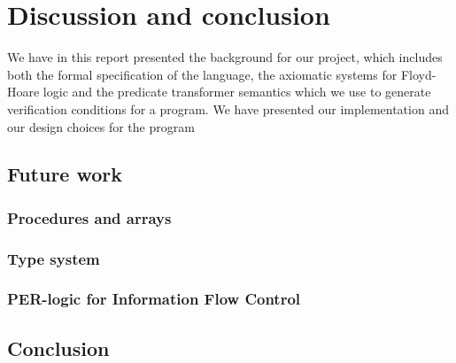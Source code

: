 \section{Discussion and conclusion}\label{sec:conclusion}
We have in this report presented the background for our project, which includes both the formal specification of the language, the axiomatic systems for Floyd-Hoare logic and the predicate transformer semantics which we use to generate verification conditions for a program. We have presented our implementation and our design choices for the program

\subsection{Future work}\label{sec:future}

\subsubsection{Procedures and arrays}

\subsubsection{Type system}

\subsubsection{PER-logic for Information Flow Control}

\subsection{Conclusion}
